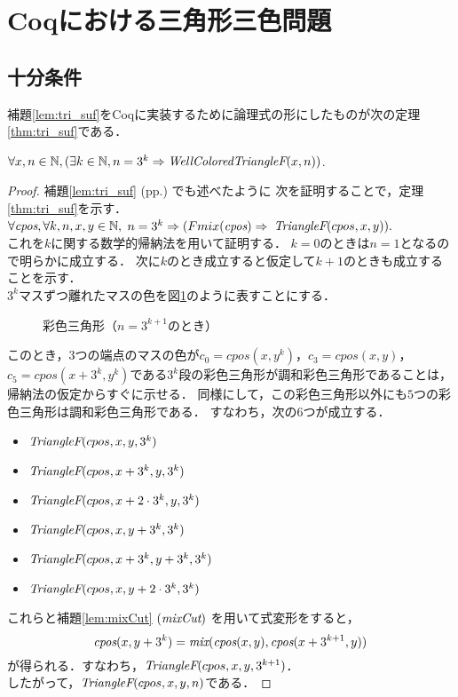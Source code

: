 \section{Coqにおける三角形三色問題}

\subsection{十分条件}
補題\ref{lem:tri_suf}をCoqに実装するために論理式の形にしたものが次の定理\ref{thm:tri_suf}である．
\begin{thm}[十分条件] \label{thm:tri_suf}
  $\forall x, n \in \mathbb{N}, (\exists k \in \mathbb{N}, n = 3 ^ k \Rightarrow \textit{WellColoredTriangleF}(x,n))$.
\end{thm}
\begin{proof}
  補題\ref{lem:tri_suf} (pp.\pageref{lem:tri_suf}) でも述べたように
  次を証明することで，定理\ref{thm:tri_suf}を示す．\\
  $\forall \textit{cpos}, \forall k, n, x, y \in \mathbb{N},$ $n = 3^k \Rightarrow (Fmix(\textit{cpos}) \Rightarrow$ $\textit{TriangleF}(cpos,x,y)).$ \\
  これを$k$に関する数学的帰納法を用いて証明する．
  $k=0$のときは$n=1$となるので明らかに成立する．
  次に$k$のとき成立すると仮定して$k+1$のときも成立することを示す．\\
  $3^k$マスずつ離れたマスの色を図\ref{fig:suf_steps}のように表すことにする．
  \begin{figure}[h]
    \centering
    
    \caption{彩色三角形（$n=3^{k+1}$のとき）}
    \label{fig:suf_steps}
  \end{figure}
  このとき，$3$つの端点のマスの色が$c_0=cpos(x,y^k)$，$c_3=cpos(x,y)$，
  $c_5=cpos(x+3^k,y^k)$である$3^k$段の彩色三角形が調和彩色三角形であることは，
  帰納法の仮定からすぐに示せる．
  同様にして，この彩色三角形以外にも$5$つの彩色三角形は調和彩色三角形である．
  すなわち，次の$6$つが成立する．
  \begin{itemize}
    \item $\textit{TriangleF}(cpos,x,y,3^k)$
    \item $\textit{TriangleF}(cpos,x+3^k,y,3^k)$
    \item $\textit{TriangleF}(cpos,x+2\cdot3^k,y,3^k)$
    \item $\textit{TriangleF}(cpos,x,y+3^k,3^k)$
    \item $\textit{TriangleF}(cpos,x+3^k,y+3^k,3^k)$
    \item $\textit{TriangleF}(cpos,x,y+2\cdot3^k,3^k)$
  \end{itemize}
  これらと補題\ref{lem:mixCut} $(\textit{mixCut})$ を用いて式変形をすると，
  \[
  \textit{cpos}(x,y+3^k)=\textit{mix}(\textit{cpos}(x,y),\textit{cpos}(x+3^{k+1},y))
  \]
  が得られる．すなわち，$\textit{TriangleF}(cpos,x,y,3^{k+1})$．\\
  したがって，$\textit{TriangleF}(cpos,x,y,n)$である．
\end{proof}


